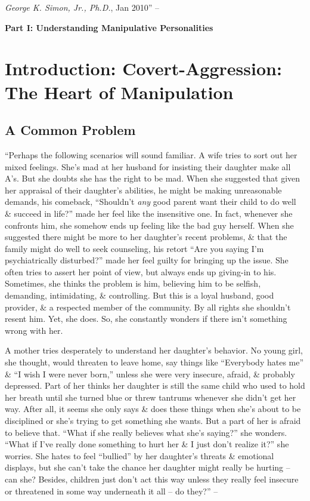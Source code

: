 \documentclass{article}
\numberwithin{equation}{section}
\begin{document}
\textit{George K. Simon, Jr., Ph.D.}, Jan 2010'' -- \cite[p. 14]{Simon2010}


\begin{center}\Large\sf
	\textbf{Part I: Understanding Manipulative Personalities}
\end{center}

\section*{Introduction: Covert-Aggression: The Heart of Manipulation}

\subsection{A Common Problem}
``Perhaps the following scenarios will sound familiar. A wife tries to sort out her mixed feelings. She's mad at her husband for insisting their daughter make all A's. But she doubts she has the right to be mad. When she suggested that given her appraisal of their daughter's abilities, he might be making unreasonable demands, his comeback, ``Shouldn't \textit{any} good parent want their child to do well \& succeed in life?'' made her feel like the insensitive one. In fact, whenever she confronts him, she somehow ends up feeling like the bad guy herself. When she suggested there might be more to her daughter's recent problems, \& that the family might do well to seek counseling, his retort ``Are you saying I'm psychiatrically disturbed?'' made her feel guilty for bringing up the issue. She often tries to assert her point of view, but always ends up giving-in to his. Sometimes, she thinks the problem is him, believing him to be selfish, demanding, intimidating, \& controlling. But this is a loyal husband, good provider, \& a respected member of the community. By all rights she shouldn't resent him. Yet, she does. So, she constantly wonders if there isn't something wrong with her.

A mother tries desperately to understand her daughter's behavior. No young girl, she thought, would threaten to leave home, say things like ``Everybody hates me'' \& ``I wish I were never born,'' unless she were very insecure, afraid, \& probably depressed. Part of her thinks her daughter is still the same child who used to hold her breath until she turned blue or threw tantrums whenever she didn't get her way. After all, it seems she only says \& does these things when she's about to be disciplined or she's trying to get something she wants. But a part of her is afraid to believe that. ``What if she really believes what she's saying?'' she wonders. ``What if I've really done something to hurt her \& I just don't realize it?'' she worries. She hates to feel ``bullied'' by her daughter's threats \& emotional displays, but she can't take the chance her daughter might really be hurting -- can she? Besides, children just don't act this way unless they really feel insecure or threatened in some way underneath it all -- do they?'' -- \cite[pp. 17--18]{Simon2010}
\end{document}
